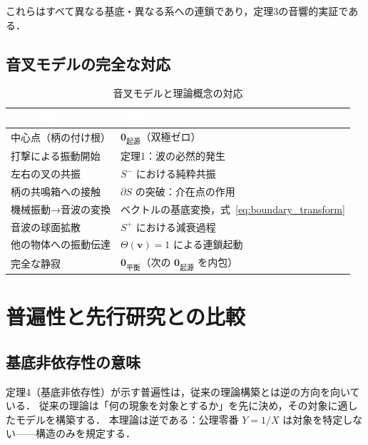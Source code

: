 \documentclass[12pt, a4paper]{article}
\theoremstyle{definition}
\newcommand{\vorigin}{\mathbf{0}_{\text{起源}}}
\newcommand{\vequil}{\mathbf{0}_{\text{平衡}}}
\newcommand{\Switch}{\Theta}
\begin{document}
これらはすべて異なる基底・異なる系への連鎖であり，定理3の音響的実証である．

\subsection{音叉モデルの完全な対応}

\begin{table}[h!]
  \centering
  \caption{音叉モデルと理論概念の対応}
  \vspace{0.3em}
  \renewcommand{\arraystretch}{1.3}
  \begin{tabularx}{\textwidth}{lX}
    \toprule
    \rowcolor{headerblue}
    \textcolor{white}{\textbf{音叉の現象}} &
    \textcolor{white}{\textbf{理論的対応}} \\
    \midrule
    中心点（柄の付け根） & $\vorigin$（双極ゼロ） \\
    打撃による振動開始   & 定理1：波の必然的発生 \\
    左右の叉の共振       & $S^-$ における純粋共振 \\
    柄の共鳴箱への接触   & $\partial S$ の突破：介在点の作用 \\
    機械振動→音波の変換  & ベクトルの基底変換，式~\eqref{eq:boundary_transform} \\
    音波の球面拡散       & $S^+$ における減衰過程 \\
    他の物体への振動伝達 & $\Switch(\mathbf{v})=1$ による連鎖起動 \\
    完全な静寂           & $\vequil$（次の $\vorigin$ を内包） \\
    \bottomrule
  \end{tabularx}
  \label{tab:tuning_fork}
\end{table}

\section{普遍性と先行研究との比較}

\subsection{基底非依存性の意味}

定理4（基底非依存性）が示す普遍性は，従来の理論構築とは逆の方向を向いている．
従来の理論は「何の現象を対象とするか」を先に決め，その対象に適したモデルを構築する．
本理論は逆である：公理零番 $Y = 1/X$ は対象を特定しない——構造のみを規定する．
\end{document}
